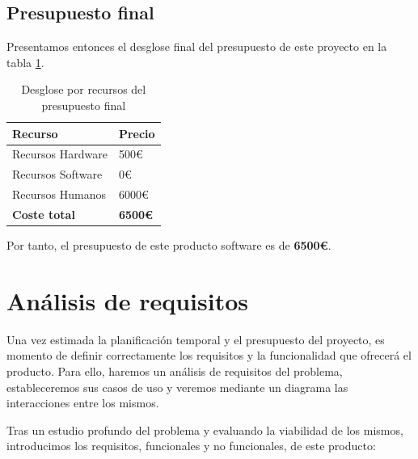 \subsection{Presupuesto final}

Presentamos entonces el desglose final del presupuesto de este proyecto en la tabla \ref{tab:presupuestos}.

\begin{table}[ht]
    \centering
    \begin{tabular}{ll}
    \hline
    \textbf{Recurso}     & \textbf{Precio} \\ \hline\hline
    Recursos Hardware    & 500\euro             \\ \hline
    Recursos Software    & 0\euro              \\ \hline
    Recursos Humanos     & 6000\euro           \\ \hline\hline
    \textbf{Coste total} & \textbf{6500\euro}  \\ \hline
    \end{tabular}
    \caption{Desglose por recursos del presupuesto final}
    \label{tab:presupuestos}
\end{table}

Por tanto, el presupuesto de este producto software es de \textbf{6500\euro}.

\section{Análisis de requisitos}

Una vez estimada la planificación temporal y el presupuesto del proyecto, es momento de definir correctamente los requisitos y la funcionalidad que ofrecerá el producto. Para ello, haremos un análisis de requisitos del problema, estableceremos sus casos de uso y veremos mediante un diagrama las interacciones entre los mismos.

Tras un estudio profundo del problema y evaluando la viabilidad de los mismos, introducimos los requisitos, funcionales y no funcionales, de este producto:


